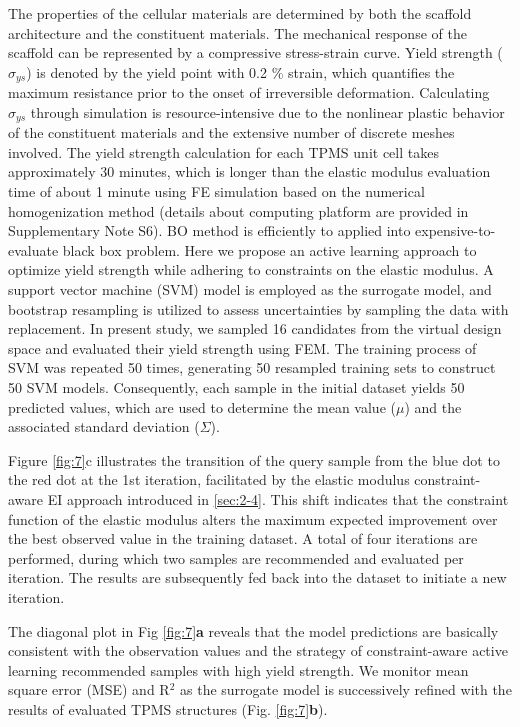 \documentclass[preprint,review,12pt,authoryear]{elsarticle}
\begin{document}
The properties of the cellular materials are determined by both the scaffold architecture and the constituent materials. The mechanical response of the scaffold can be represented by a compressive stress-strain curve. Yield strength ($\sigma_{ys}$) is denoted by the yield point with 0.2 \% strain, which quantifies the maximum resistance prior to the onset of irreversible deformation. Calculating $\sigma_{ys}$ through simulation is resource-intensive due to the nonlinear plastic behavior of the constituent materials and the extensive number of discrete meshes involved. The yield strength calculation for each TPMS unit cell takes approximately 30 minutes, which is longer than the elastic modulus evaluation time of about 1 minute using FE simulation based on the numerical homogenization method (details about computing platform are provided in Supplementary Note S6). BO method is efficiently to applied into expensive-to-evaluate black box problem. Here we propose an active learning approach to optimize yield strength while adhering to constraints on the elastic modulus. A support vector machine (SVM) model is employed as the surrogate model, and bootstrap resampling is utilized to assess uncertainties by sampling the data with replacement. In present study, we sampled 16 candidates from the virtual design space and evaluated their yield strength using FEM. The training process of SVM was repeated 50 times, generating 50 resampled training sets to construct 50 SVM models. Consequently, each sample in the initial dataset yields 50 predicted values, which are used to determine the mean value ($\mu$) and the associated standard deviation ($\Sigma$).

Figure \ref{fig:7}c illustrates the transition of the query sample from the blue dot to the red dot at the 1st iteration, facilitated by the elastic modulus constraint-aware EI approach introduced in \ref{sec:2-4}. This shift indicates that the constraint function of the elastic modulus alters the maximum expected improvement over the best observed value in the training dataset. A total of four iterations are performed, during which two samples are recommended and evaluated per iteration. The results are subsequently fed back into the dataset to initiate a new iteration.

The diagonal plot in Fig \ref{fig:7}\textbf{a} reveals that the model predictions are basically consistent with the observation values and the strategy of constraint-aware active learning recommended samples with high yield strength. We monitor mean square error (MSE) and R$^2$ as the surrogate model is successively refined with the results of evaluated TPMS structures  (Fig. \ref{fig:7}\textbf{b}). 
\end{document}

